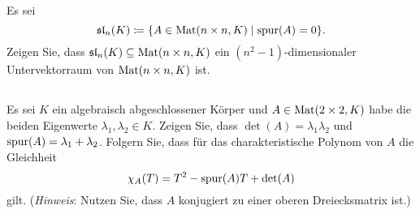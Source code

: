 \documentclass[a4paper,9pt]{extarticle}
\begin{document}
\subsection{}
Es sei
\[
 \mathfrak{sl}_n(K) \coloneqq \{A \in \mathrm{Mat}(n \times n, K) \mid \mathrm{spur}(A) = 0\}.
\]
Zeigen Sie, dass $\mathfrak{sl}_n(K) \subseteq \mathrm{Mat}(n \times n, K)$ ein $(n^2-1)$-dimensionaler Untervektorraum von $\mathrm{Mat}(n \times n, K)$ ist.

\subsection{}
Es sei $K$ ein algebraisch abgeschlossener Körper und $A \in \mathrm{Mat}(2 \times 2, K)$ habe die beiden Eigenwerte $\lambda_1, \lambda_2 \in K$. Zeigen Sie, dass $\det(A) = \lambda_1 \lambda_2$ und $\mathrm{spur}(A) = \lambda_1 + \lambda_2$. Folgern Sie, dass für das charakteristische Polynom von $A$ die Gleichheit
\[
 \chi_A(T) = T^2 - \mathrm{spur}(A) T + \det(A)
\]
gilt. (\emph{Hinweis}: Nutzen Sie, dass $A$ konjugiert zu einer oberen Dreiecksmatrix ist.)
\end{document}
